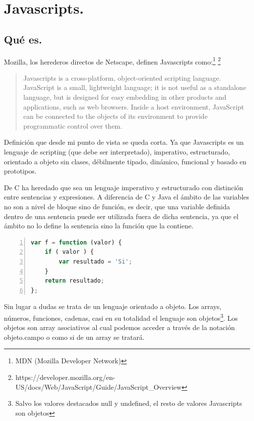 \section{Javascripts.}

\subsection{Qué es.}

Mozilla, los herederos directos de Netscape, definen Javascripts como:\footnote{MDN (Mozilla Developer Network)} \footnote{https://developer.mozilla.org/en-US/docs/Web/JavaScript/Guide/JavaScript\_Overview}

\begin{quotation}
Javascripts is a cross-platform, object-oriented scripting language. JavaScript is a small, lightweight language; it is not useful as a standalone language, but is designed for easy embedding in other products and applications, such as web browsers. Inside a host environment, JavaScript can be connected to the objects of its environment to provide programmatic control over them.
\end{quotation}

Definición que desde mi punto de vista se queda corta. Ya que Javascripts es un lenguaje de scripting (que debe ser interpretado), imperativo, estructurado, orientado a objeto sin clases, débilmente tipado, dinámico, funcional y basado en prototipos.

De C ha heredado que sea un lenguaje imperativo y estructurado con distinción entre sentencias y expresiones. A diferencia de C y Java el ámbito de las variables no son a nivel de bloque sino de función, es decir, que una variable definida dentro de una sentencia puede ser utilizada fuera de dicha sentencia, ya que el ámbito no lo define la sentencia sino la función que la contiene.

\begin{lstlisting}[language=JavaScript, numbers=left]
var f = function (valor) {
	if ( valor ) {
		var resultado = 'Si';
	} 
	return resultado;
};
\end{lstlisting}

Sin lugar a dudas se trata de un lenguaje orientado a objeto. Los arrays, números, funciones, cadenas, casi en su totalidad el lenguaje son objetos\footnote{Salvo los valores destacados null y undefined, el resto de valores Javascripts son objetos}. Los objetos son array asociativos al cual podemos acceder a través de la notación objeto.campo o como si de un array se tratará. 

